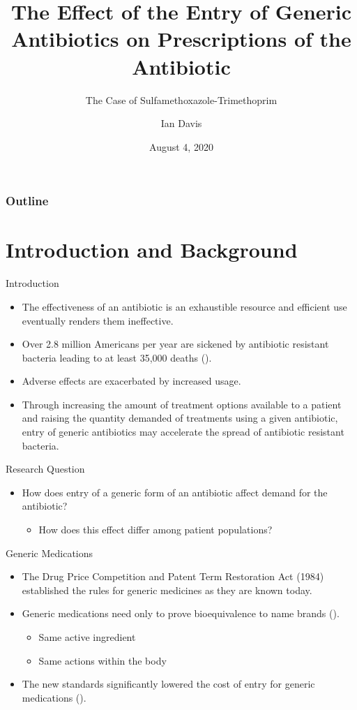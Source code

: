 \documentclass{beamer}
\title{The Effect of the Entry of Generic Antibiotics on Prescriptions of the Antibiotic}
\subtitle{The Case of Sulfamethoxazole-Trimethoprim}
\author{Ian Davis}
\institute{Clemson University}
\date{August 4, 2020}
\begin{document}
\begin{frame}
\titlepage
\end{frame}

\begin{frame}
\frametitle{Outline}
\tableofcontents
\end{frame}

\section{Introduction and Background}
\begin{frame}{Introduction}
\begin{itemize}
\item The effectiveness of an antibiotic is an exhaustible resource and efficient use eventually renders them ineffective.
\item Over 2.8 million Americans per year are sickened by antibiotic resistant bacteria leading to at least 35,000 deaths (\cite{centers_for_disease_control_and_prevention_us_antibiotic_2019}).
\item Adverse effects are exacerbated by increased usage.
\item Through increasing the amount of treatment options available to a patient and raising the quantity demanded of treatments using a given antibiotic, entry of generic antibiotics may accelerate the spread of antibiotic resistant bacteria.
\end{itemize}
\end{frame}

\begin{frame}{Research Question}
\begin{itemize}
\item How does entry of a generic form of an antibiotic affect demand for the antibiotic? 
\begin{itemize}
\item How does this effect differ among patient populations?
\end{itemize}
\end{itemize}
\end{frame}

\begin{frame}{Generic Medications}
\begin{itemize}
\item The Drug Price Competition and Patent Term Restoration Act (1984) established the rules for generic medicines as they are known today.
\item Generic medications need only to prove bioequivalence to name brands (\cite{fda_primer}).
\begin{itemize}
  \item Same active ingredient
  \item Same actions within the body
\end{itemize}
\item The new standards significantly lowered the cost of entry for generic medications (\cite{eban_bottle_2019}).
\end{itemize}
\end{frame}
\end{document}
